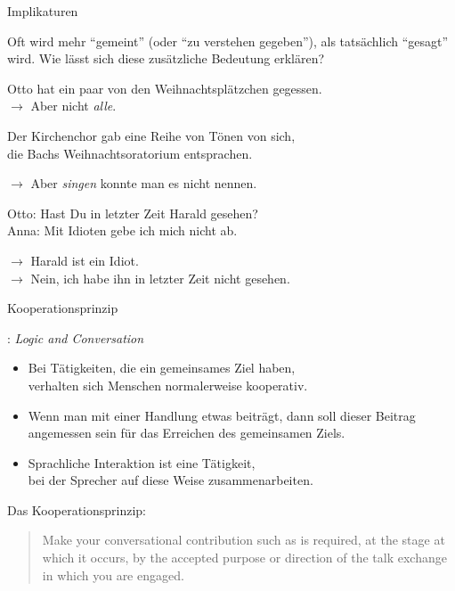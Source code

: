 \begin{frame}{Implikaturen}

 Oft wird mehr "`gemeint"' (oder "`zu verstehen gegeben"'), als tatsächlich "`gesagt"' wird. Wie lässt sich diese zusätzliche Bedeutung erklären?
  

 \begin{exe}
  \ex Otto hat ein paar von den Weihnachtsplätzchen gegessen.\\

       $\to$ \alert{Aber nicht \textit{alle}.}

\pause

\ex Der Kirchenchor gab eine Reihe von Tönen von sich,\\
    die Bachs Weihnachtsoratorium entsprachen.\pause

$\to$ \alert{Aber \textit{singen} konnte man es nicht nennen.}

\pause
\ex Otto: Hast Du in letzter Zeit Harald gesehen?\\
    Anna: Mit Idioten gebe ich mich nicht ab.\pause


       $\to$ \alert{Harald ist ein Idiot.}\\
       $\to$ \alert{Nein, ich habe ihn in letzter Zeit nicht gesehen.}
 \end{exe}



\end{frame}








\begin{frame}{Kooperationsprinzip}

\cite{Grice1975}: \textit{Logic and Conversation}


\begin{itemize}
\item Bei Tätigkeiten, die ein gemeinsames Ziel haben,\\
      verhalten sich Menschen normalerweise kooperativ.
\pause
\item Wenn man mit einer Handlung etwas beiträgt, dann soll dieser Beitrag angemessen sein für das Erreichen des gemeinsamen Ziels.
\pause
\item Sprachliche Interaktion ist eine Tätigkeit, \\
      bei der Sprecher auf diese Weise zusammenarbeiten.
\end{itemize}

\pause
Das Kooperationsprinzip:

\begin{quote}
  Make your conversational contribution such as is required, at the stage at which it occurs, by the accepted purpose or direction of the talk exchange in which you are engaged.
\end{quote}
  
\end{frame}



